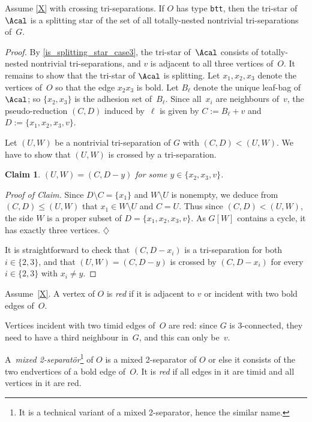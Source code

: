 \documentclass{aic}
\newenvironment{cproof}{\noindent\textit{Proof of Claim.}}{\phantom{!}\!\hfill$\diamondsuit$}
\theoremstyle{plain}
\newtheorem{sublem}{Claim}[thm]
\theoremstyle{definition}
\theoremstyle{plain}
\theoremstyle{plain}
\newcommand{\sm}{\setminus}
\renewcommand{\leq}{\leqslant}
\newcommand{\ty}[1]{{\tt#1}}
\begin{document}
\begin{lem}\label{bttExtra}
Assume \autoref{X} with crossing tri-separations.
If $O$ has type \ty{btt}, then the tri-star of~$\Acal$ is a splitting star of the set of all totally-nested nontrivial tri-separations of~$G$.
\end{lem}
\begin{proof}
By \autoref{is_splitting_star_case3}, the tri-star of~$\Acal$ consists of totally-nested nontrivial tri-separations, and 
$v$ is adjacent to all three vertices of~$O$. It remains to show that the tri-star of $\Acal$ is splitting. 
Let $x_1,x_2,x_3$ denote the vertices of~$O$ so that the edge $x_2 x_3$ is bold.
Let $B_\ell$ denote the unique leaf-bag of~$\Acal$; so $\{x_2,x_3\}$ is the adhesion set of~$B_\ell$.
Since all~$x_i$ are neighbours of~$v$, the pseudo-reduction $(C,D)$ induced by~$\ell$ is given by $C:=B_\ell+v$ and $D:=\{x_1,x_2,x_3,v\}$.

Let $(U,W)$ be  a nontrivial tri-separation of $G$ with $(C,D)<(U,W)$. 
We have to show that $(U,W)$ is crossed by a tri-separation.

\begin{sublem}
$(U,W)=(C,D-y)$ for some $y\in \{x_2,x_3,v\}$.   
\end{sublem}
\begin{cproof}
    Since $D\sm C=\{x_1\}$ and $W\sm U$ is nonempty, we deduce from $(C,D)\leq (U,W)$ that  $x_1\in W\sm U$ and $C=U$. Thus since $(C,D)<(U,W)$, the side $W$ is a proper subset of $D=\{x_1,x_2,x_3,v\}$. As $G[W]$ contains a cycle, it has exactly three vertices.
\end{cproof}\medskip

It is straightforward to check that $(C,D-x_i)$ is a tri-separation for both $i\in \{2,3\}$, and that $(U,W)=(C,D-y)$ is crossed by $(C,D-x_i)$ for every $i\in \{2,3\}$ with $x_i\neq y$.
\end{proof}

\begin{dfn}[Red]
Assume~\autoref{X}.
A vertex of $O$ is \emph{red} if it is adjacent to $v$ or incident with two bold edges of~$O$. 
\end{dfn}

\begin{eg}\label{eg-red}
    Vertices incident with two timid edges of~$O$ are red: since $G$ is 3-connected, they need to have a third neighbour in~$G$, and this can only be~$v$.
\end{eg}
A~\emph{mixed 2-separat{\"o}r}\footnote{It is a technical variant of a mixed 2-separator, hence the similar name.} of $O$ is a mixed 2-separator of $O$ or else it consists of the two endvertices of a bold edge of~$O$. 
It is \emph{red} if all edges in it are timid and all vertices in it are red.
\end{document}

